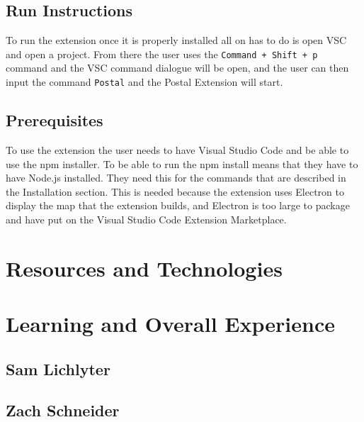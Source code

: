 \documentclass[letterpaper,10pt,titlepage,draftclsnofoot,onecolumn,onesided] {IEEEtran}
\begin{document}
\subsection{Run Instructions}

To run the extension once it is properly installed all on has to do is open VSC and open a project. 
From there the user uses the \texttt{Command + Shift + p} command and the VSC command dialogue will be open, and the user can then input the command \texttt{Postal} and the Postal Extension will start.

\subsection{Prerequisites}

To use the extension the user needs to have Visual Studio Code and be able to use the npm installer.
To be able to run the npm install means that they have to have Node.js installed. 
They need this for the commands that are described in the Installation section.
This is needed because the extension uses Electron to display the map that the extension builds, and Electron is too large to package and have put on the Visual Studio Code Extension Marketplace.


\section{Resources and Technologies}

\section{Learning and Overall Experience}

\subsection{Sam Lichlyter}

\subsection{Zach Schneider}
\end{document}
